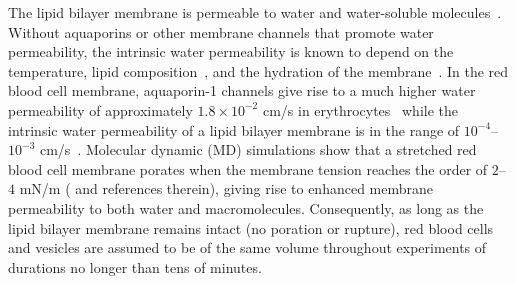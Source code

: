 \documentclass[9pt,twocolumn,twoside,lineno]{pnas-new}
\begin{document}
The lipid bilayer membrane is permeable to water and water-soluble
molecules~\cite{Dick1964_JTB, FettiplaceHaydon1980_PhysRev,
DeamerBramhall1986_ChemPhysLipids, Grafmueller2019_ABLS}. 
%
%
Without aquaporins or other membrane channels that promote water
permeability, the intrinsic water permeability is known to depend on the
temperature, lipid composition~\cite{OlbrichRawiczNeedhamEtAl2000_BJ},
and the hydration of the membrane~\cite{MarrinkBerendsen1994_JPhysChem}.
In the red blood cell membrane, aquaporin-1 channels give rise to a much
higher water permeability of approximately $1.8\times 10^{-2}$ cm/s in
erythrocytes~\cite{YangMaVerkman2001_JBC} while the intrinsic water
permeability of a lipid bilayer membrane is in the range of
$10^{-4}$--$10^{-3}$ cm/s~\cite{ThompsonHuang1966_ANYAS,
FettiplaceHaydon1980_PhysRev, Grafmueller2019_ABLS, Dimova2020_GVB,
BhatiaRobinsonDimova2020_SoftMatt}. 
%
Molecular dynamic (MD) simulations show that a stretched red blood cell
membrane porates when the membrane tension reaches the order of $2$--$4$
mN/m (\cite{RazizadehNikfarPaulLiu2020_BJ} and references therein),
giving rise to enhanced membrane permeability to both water and
macromolecules. Consequently, as long as the lipid bilayer membrane
remains intact (no poration or rupture), red blood cells and vesicles
are assumed to be of the same volume throughout experiments of durations
no longer than tens of minutes.
%
\end{document}
